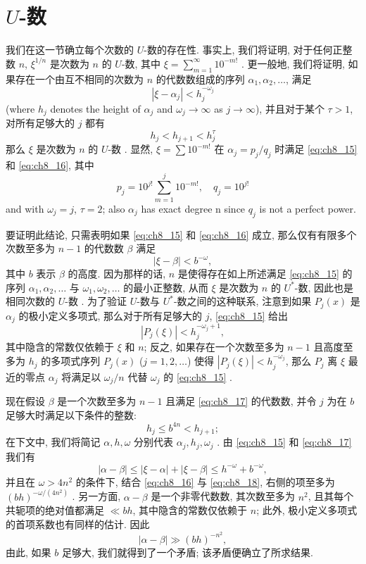 \section{$U$-数}\label{sec:ch8_6}

我们在这一节确立每个次数的 $U$-数的存在性. 事实上, 我们将证明, 对于任何正整数 $n$, $\xi^{1/n}$ 是次数为 $n$ 的 $U$-数, 其中 $\xi = \sum_{m=1}^{\infty} 10^{-m!}$ . 更一般地, 我们将证明, 如果存在一个由互不相同的次数为 $n$ 的代数数组成的序列 $\alpha_1, \alpha_2, \dots$, 满足
\[|\xi - \alpha_j| < h_j^{-\omega_j} \tag{15}\label{eq:ch8_15}\]
(where $h_j$ denotes the height of $\alpha_j$ and $\omega_j \to \infty$ as $j \to \infty$), 并且对于某个 $\tau > 1$, 对所有足够大的 $j$ 都有
\[h_j < h_{j+1} < h_j^{\tau} \tag{16}\label{eq:ch8_16}\]
那么 $\xi$ 是次数为 $n$ 的 $U$-数 . 显然, $\xi = \sum 10^{-m!}$ 在 $\alpha_j = p_j/q_j$ 时满足 \eqref{eq:ch8_15} 和 \eqref{eq:ch8_16}, 其中
\[p_j = 10^{j!} \sum_{m=1}^{j} 10^{-m!}, \quad q_j = 10^{j!}\]
and with $\omega_j = j$, $\tau = 2$; also $\alpha_j$ has exact degree n since $q_j$ is not a perfect power.

要证明此结论, 只需表明如果 \eqref{eq:ch8_15} 和 \eqref{eq:ch8_16} 成立, 那么仅有有限多个次数至多为 $n-1$ 的代数数 $\beta$ 满足
\[|\xi - \beta| < b^{-\omega}, \tag{17}\label{eq:ch8_17}\]
其中 $b$ 表示 $\beta$ 的高度. 因为那样的话, $n$ 是使得存在如上所述满足 \eqref{eq:ch8_15} 的序列 $\alpha_1, \alpha_2, \dots$ 与 $\omega_1, \omega_2, \dots$ 的最小正整数, 从而 $\xi$ 是次数为 $n$ 的 $U^*$-数, 因此也是相同次数的 $U$-数 . 为了验证 $U$-数与 $U^*$-数之间的这种联系, 注意到如果 $P_j(x)$ 是 $\alpha_j$ 的极小定义多项式, 那么对于所有足够大的 $j$, \eqref{eq:ch8_15} 给出
\[|P_j(\xi)| < h_j^{-\omega_j+1},\]
其中隐含的常数仅依赖于 $\xi$ 和 $n$; 反之, 如果存在一个次数至多为 $n-1$ 且高度至多为 $h_j$ 的多项式序列 $P_j(x)$ ($j=1,2,\dots$) 使得 $|P_j(\xi)| < h_j^{-\omega_j}$, 那么 $P_j$ 离 $\xi$ 最近的零点 $\alpha_j$ 将满足以 $\omega_j/n$ 代替 $\omega_j$ 的 \eqref{eq:ch8_15} .

现在假设 $\beta$ 是一个次数至多为 $n-1$ 且满足 \eqref{eq:ch8_17} 的代数数, 并令 $j$ 为在 $b$ 足够大时满足以下条件的整数:
\[h_j \le b^{4n} < h_{j+1}; \tag{18}\label{eq:ch8_18}\]
在下文中, 我们将简记 $\alpha, h, \omega$ 分别代表 $\alpha_j, h_j, \omega_j$ . 由 \eqref{eq:ch8_15} 和 \eqref{eq:ch8_17} 我们有
\[|\alpha - \beta| \le |\xi - \alpha| + |\xi - \beta| \le h^{-\omega} + b^{-\omega},\]
并且在 $\omega > 4n^2$ 的条件下, 结合 \eqref{eq:ch8_16} 与 \eqref{eq:ch8_18}, 右侧的项至多为 $(bh)^{-\omega/(4n^2)}$ . 另一方面, $\alpha-\beta$ 是一个非零代数数, 其次数至多为 $n^2$, 且其每个共轭项的绝对值都满足 $\ll bh$, 其中隐含的常数仅依赖于 $n$; 此外, 极小定义多项式的首项系数也有同样的估计. 因此
\[|\alpha-\beta| \gg (bh)^{-n^2},\]
由此, 如果 $b$ 足够大, 我们就得到了一个矛盾; 该矛盾便确立了所求结果.

